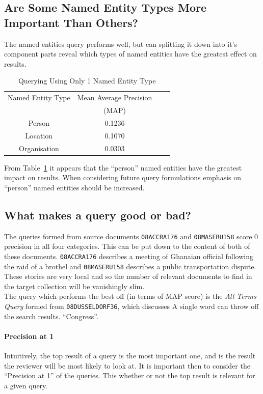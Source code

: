 \documentclass{l4proj}
\newcommand{\code}[1]{\texttt{#1}}
\begin{document}
\subsection{Are Some Named Entity Types More Important Than Others?}
The named entities query performs well, but can splitting it down into it's component parts reveal which types of named entities have the greatest effect on results.
\begin{table}[H]
\centering
\begin{tabular}{|c|c|c|c|}
\hline
Named Entity Type 	& Mean Average Precision	\\ 
					& (MAP) 					\\ \hline
Person          	& 0.1236 					\\ \hline
Location			& 0.1070 					\\ \hline
Organisation 		& 0.0303 					\\ \hline
\end{tabular}
\caption{Querying Using Only 1 Named Entity Type}
\label{namedentityresults}
\end{table}
From Table~\ref{namedentityresults} it appears that the ``person'' named entities have the greatest impact on results. When considering future query formulations emphasis on ``person'' named entities should be increased.
\subsection{What makes a query good or bad?}
The queries formed from source documents \code{08ACCRA176} and \code{08MASERU158} score 0 precision in all four categories. This can be put down to the content of both of these documents. \code{08ACCRA176} describes a meeting of Ghanaian official following the raid of a brothel and \code{08MASERU158} describes a public transportation dispute. These stories are very local and so the number of relevant documents to find in the target collection will be vanishingly slim. \\
The query which performs the best off (in terms of MAP score) is the \textit{All Terms Query} formed from \code{08DUSSELDORF36}, which discusses
A single word can throw off the search results. ``Congress''. \\
\paragraph{Precision at 1}
Intuitively, the top result of a query is the most important one, and is the result the reviewer will be most likely to look at. It is important then to consider the ``Precision at 1'' of the queries. This whether or not the top result is relevant for a given query. 
\end{document}
